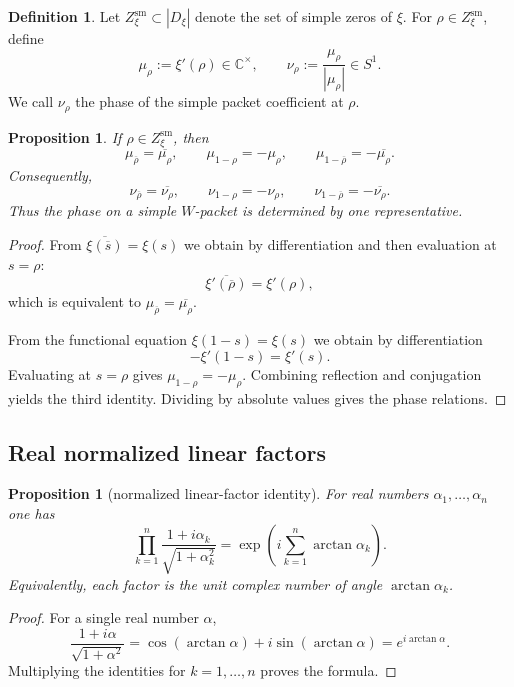 \documentclass[11pt,a4paper]{article}
\newtheorem{proposition}[theorem]{Proposition}
\theoremstyle{definition}
\newtheorem{definition}[theorem]{Definition}
\theoremstyle{remark}
\newcommand{\CC}{\mathbb C}
\begin{document}
\begin{definition}
Let $Z_\xi^{\mathrm{sm}}\subset |D_\xi|$ denote the set of simple zeros of $\xi$. For $\rho\in Z_\xi^{\mathrm{sm}}$, define
\[
\mu_\rho:=\xi'(\rho)\in\CC^\times,
\qquad\nu_\rho:=\frac{\mu_\rho}{|\mu_\rho|}\in S^1.
\]
We call $\nu_\rho$ the phase of the simple packet coefficient at $\rho$.
\end{definition}

\begin{proposition}\label{prop:xi-phase-symmetry}
If $\rho\in Z_\xi^{\mathrm{sm}}$, then
\[
\mu_{\overline\rho}=\overline{\mu_\rho},
\qquad
\mu_{1-\rho}=-\mu_\rho,
\qquad
\mu_{1-\overline\rho}=-\overline{\mu_\rho}.
\]
Consequently,
\[
\nu_{\overline\rho}=\overline{\nu_\rho},
\qquad
\nu_{1-\rho}=-\nu_\rho,
\qquad
\nu_{1-\overline\rho}=-\overline{\nu_\rho}.
\]
Thus the phase on a simple $W$-packet is determined by one representative.
\end{proposition}

\begin{proof}
From $\overline{\xi(\overline s)}=\xi(s)$ we obtain by differentiation and then evaluation at $s=\rho$:
\[
\overline{\xi'(\overline\rho)}=\xi'(\rho),
\]
which is equivalent to $\mu_{\overline\rho}=\overline{\mu_\rho}$.

From the functional equation $\xi(1-s)=\xi(s)$ we obtain by differentiation
\[
-\xi'(1-s)=\xi'(s).
\]
Evaluating at $s=\rho$ gives $\mu_{1-\rho}=-\mu_\rho$. Combining reflection and conjugation yields the third identity. Dividing by absolute values gives the phase relations.
\end{proof}

\subsection{Real normalized linear factors}

\begin{proposition}[normalized linear-factor identity]\label{prop:real-factor}
For real numbers $\alpha_1,\dots,\alpha_n$ one has
\[
\prod_{k=1}^n \frac{1+i\alpha_k}{\sqrt{1+\alpha_k^2}}
=\exp\!\left(i\sum_{k=1}^n \arctan \alpha_k\right).
\]
Equivalently, each factor is the unit complex number of angle $\arctan\alpha_k$.
\end{proposition}

\begin{proof}
For a single real number $\alpha$,
\[
\frac{1+i\alpha}{\sqrt{1+\alpha^2}}
=\cos(\arctan\alpha)+i\sin(\arctan\alpha)
=e^{i\arctan\alpha}.
\]
Multiplying the identities for $k=1,\dots,n$ proves the formula.
\end{proof}
\end{document}

